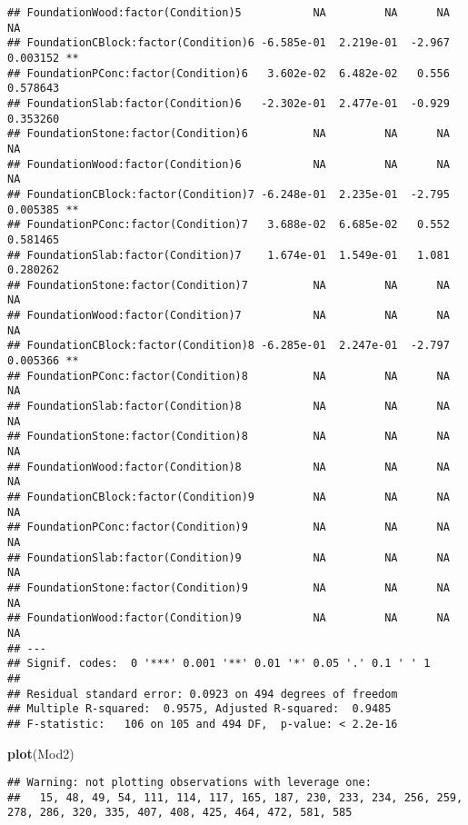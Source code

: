 \documentclass[
]{article}
\newenvironment{Shaded}{\begin{snugshade}}{\end{snugshade}}
\newcommand{\KeywordTok}[1]{\textcolor[rgb]{0.13,0.29,0.53}{\textbf{#1}}}
\newcommand{\NormalTok}[1]{#1}
\begin{document}
\begin{verbatim}
## FoundationWood:factor(Condition)5           NA         NA      NA       NA    
## FoundationCBlock:factor(Condition)6 -6.585e-01  2.219e-01  -2.967 0.003152 ** 
## FoundationPConc:factor(Condition)6   3.602e-02  6.482e-02   0.556 0.578643    
## FoundationSlab:factor(Condition)6   -2.302e-01  2.477e-01  -0.929 0.353260    
## FoundationStone:factor(Condition)6          NA         NA      NA       NA    
## FoundationWood:factor(Condition)6           NA         NA      NA       NA    
## FoundationCBlock:factor(Condition)7 -6.248e-01  2.235e-01  -2.795 0.005385 ** 
## FoundationPConc:factor(Condition)7   3.688e-02  6.685e-02   0.552 0.581465    
## FoundationSlab:factor(Condition)7    1.674e-01  1.549e-01   1.081 0.280262    
## FoundationStone:factor(Condition)7          NA         NA      NA       NA    
## FoundationWood:factor(Condition)7           NA         NA      NA       NA    
## FoundationCBlock:factor(Condition)8 -6.285e-01  2.247e-01  -2.797 0.005366 ** 
## FoundationPConc:factor(Condition)8          NA         NA      NA       NA    
## FoundationSlab:factor(Condition)8           NA         NA      NA       NA    
## FoundationStone:factor(Condition)8          NA         NA      NA       NA    
## FoundationWood:factor(Condition)8           NA         NA      NA       NA    
## FoundationCBlock:factor(Condition)9         NA         NA      NA       NA    
## FoundationPConc:factor(Condition)9          NA         NA      NA       NA    
## FoundationSlab:factor(Condition)9           NA         NA      NA       NA    
## FoundationStone:factor(Condition)9          NA         NA      NA       NA    
## FoundationWood:factor(Condition)9           NA         NA      NA       NA    
## ---
## Signif. codes:  0 '***' 0.001 '**' 0.01 '*' 0.05 '.' 0.1 ' ' 1
## 
## Residual standard error: 0.0923 on 494 degrees of freedom
## Multiple R-squared:  0.9575, Adjusted R-squared:  0.9485 
## F-statistic:   106 on 105 and 494 DF,  p-value: < 2.2e-16
\end{verbatim}

\begin{Shaded}
\begin{Highlighting}[]
\KeywordTok{plot}\NormalTok{(Mod2)}
\end{Highlighting}
\end{Shaded}

\begin{verbatim}
## Warning: not plotting observations with leverage one:
##   15, 48, 49, 54, 111, 114, 117, 165, 187, 230, 233, 234, 256, 259, 278, 286, 320, 335, 407, 408, 425, 464, 472, 581, 585
\end{verbatim}
\end{document}
